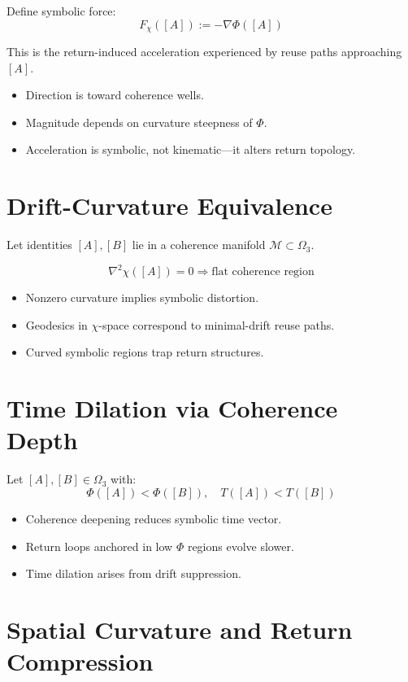 Define symbolic force:
\[
F_\chi([A]) := -\nabla\Phi([A])
\]

This is the return-induced acceleration experienced by reuse paths approaching $[A]$.

\begin{itemize}
  \item Direction is toward coherence wells.
  \item Magnitude depends on curvature steepness of $\Phi$.
  \item Acceleration is symbolic, not kinematic—it alters return topology.
\end{itemize}

\section{Drift-Curvature Equivalence} \label{sec:curvature}

Let identities $[A], [B]$ lie in a coherence manifold $\mathcal{M} \subset \Omega_3$.

\[
\nabla^2 \chi([A]) = 0 \Rightarrow \text{flat coherence region}
\]

\begin{itemize}
  \item Nonzero curvature implies symbolic distortion.
  \item Geodesics in $\chi$-space correspond to minimal-drift reuse paths.
  \item Curved symbolic regions trap return structures.
\end{itemize}

\section{Time Dilation via Coherence Depth} \label{sec:dilation}

Let $[A], [B] \in \Omega_3$ with:
\[
\Phi([A]) < \Phi([B]),\quad T([A]) < T([B])
\]

\begin{itemize}
  \item Coherence deepening reduces symbolic time vector.
  \item Return loops anchored in low $\Phi$ regions evolve slower.
  \item Time dilation arises from drift suppression.
\end{itemize}

\section{Spatial Curvature and Return Compression} \label{sec:space-curvature}


